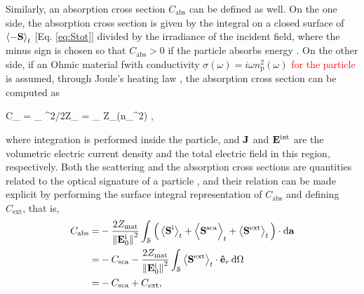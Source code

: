 Similarly, an absorption cross section $C_\text{abs}$ can be defined as well. On the one side, the absorption cross section is given by the integral on a closed surface of \textcolor{red}{$\ev{-\vb{S}}_t$}  [Eq. \eqref{eq:Stot}] divided by the irradiance of the incident field, where the minus sign is chosen so that $C_\text{abs}>0$ if the particle absorbs energy  \cite{bohren_absorption_1983}. On the other side, if an Ohmic material fwith conductivity $\sigma(\omega) = i\omega n_\text{p}^2(\omega)$ \cite{jackson_classical_1999} \textcolor{red}{for the particle} is assumed, through Joule's heating law \cite{tsang_scattering_2000}, the absorption cross section can be computed as
%
%
%
%
%
%
 \begin{tcolorbox}[title = Ohmic Particle - Absorption Cross Section,	ams align, breakable]
 	C_ =	 \int_ 
 									{^2/2Z_}
				= \int_ \omega Z_\Im(n_^2)  ,
 \label{eq:Cabs}
 \end{tcolorbox}%
%
\noindent
where integration is performed inside the particle, and $\vb{J}$  and $\vb{E}^\text{int}$ are the volumetric electric current density and the total electric field in this region, respectively. Both the  scattering and the absorption cross sections are quantities related to the optical signature of a particle \cite{pellarin_forward_2019}, and their relation can be made explicit by performing the surface integral representation of $C_\text{abs}$ and defining $C_\text{ext}$, that is,
%
\begin{align}
C_\text{abs} = & - \frac{2Z_\text{mat}}{\norm{\vb{E}^\text{i}_0}^2}\int_\mathcal{S}
                        \Big(
                                \ev{\vb{S}^\text{i}}_t + \Bigl\langle\vb{S}^\text{sca}\Bigr\rangle_t + \ev{\vb{S}^\text{ext}}_t
                        \Big)\cdot\dd{\vb{a}}
					\notag \\
			=  & - C_\text{sca} - \frac{2Z_\text{mat}}{\norm{\vb{E}_0^\text{i}}^2}\int_\mathcal{S}
                        \ev{\vb{S}^\text{ext}}_t\cdot \vu{e}_r\dd{\Omega}
					\notag \\
			= & -C_\text{sca} + C_\text{ext},
\label{eq:CabsScaInt}
\end{align}
